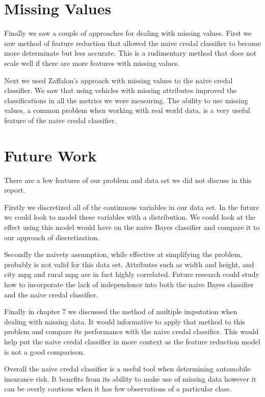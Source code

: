 \section{Missing Values}
Finally we saw a couple of approaches for dealing with missing values.
First we saw method of feature reduction that allowed the naive credal classifier to become more determinate but less accurate.
This is a rudimentary method that does not scale well if there are more features with missing values.

Next we used Zaffalon's approach with missing values to the naive credal classifier.
We saw that using vehicles with missing attributes improved the classifications in all the metrics we were measuring.
The ability to use missing values, a common problem when working with real world data, is a very useful feature of the naive credal classifier.

\section{Future Work}

There are a few features of our problem and data set we did not discuss in this report.

Firstly we discretized all of the continuous variables in our data set.
In the future we could look to model these variables with a distribution.
We could look at the effect using this model would have on the naive Bayes classifier and compare it to our approach of discretization.

Secondly the naivety assumption, while effective at simplifying the problem, probably is not valid for this data set.
Attributes such as width and height, and city mpg and rural mpg are in fact highly correlated.
Future research could study how to incorporate the lack of independence into both the naive Bayes classifier and the naive credal classifier.

Finally in chapter 7 we discussed the method of multiple imputation when dealing with missing data.
It would informative to apply that method to this problem and compare its performance with the naive credal classifier.
This would help put the naive credal classifier in more context as the feature reduction model is not a good comparison.

Overall the naive credal classifier is a useful tool when determining automobile insurance risk.
It benefits from its ability to make use of missing data however it can be overly cautious when it has few observations of a particular class.